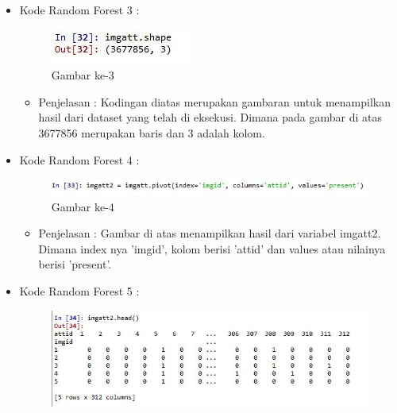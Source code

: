 \begin{enumerate}
\begin{itemize}
\begin{itemize}
\begin{itemize}
\begin{itemize}
\par
\end{itemize}
\item Kode Random Forest 3 :
\par
\begin{figure}[ht]
\centering
\includegraphics[scale=0.7]{figures/hmm/cod3.jpg}
\caption{Gambar ke-3}
\label{contoh}
\end{figure}
\par
\begin{itemize}
\item Penjelasan : Kodingan diatas merupakan gambaran untuk menampilkan hasil dari dataset yang telah di eksekusi. Dimana pada gambar di atas 3677856 merupakan baris dan 3 adalah kolom.
\par
\par
\end{itemize}
\item Kode Random Forest 4 :
\par
\begin{figure}[ht]
\centering
\includegraphics[scale=0.7]{figures/hmm/cod4.jpg}
\caption{Gambar ke-4}
\label{contoh}
\end{figure}
\par
\begin{itemize}
\item Penjelasan : Gambar di atas menampilkan hasil dari variabel imgatt2. Dimana index nya 'imgid', kolom berisi 'attid' dan values atau nilainya berisi 'present'.
\par
\par
\end{itemize}
\item Kode Random Forest 5 :
\par
\begin{figure}[ht]
\centering
\includegraphics[scale=0.7]{figures/hmm/cod5.jpg}

\end{figure}
\end{itemize}
\end{itemize}
\end{itemize}
\end{enumerate}
